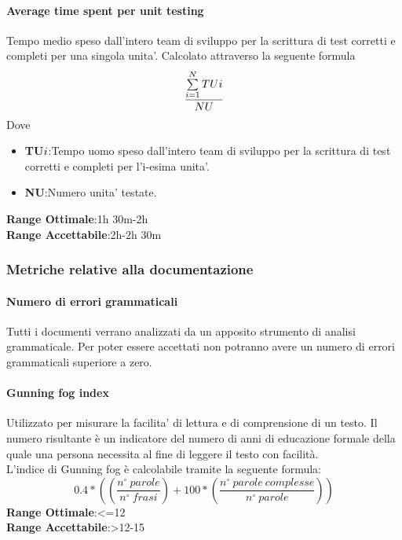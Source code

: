 \paragraph{Average time spent per unit testing}
\begin{flushleft}
Tempo medio speso dall'intero team di sviluppo per la scrittura di test corretti e completi per una singola unita'.
Calcolato attraverso la seguente formula
	$$\frac{\sum\limits_{i=1}^N TU{\small{i}}}{NU}$$
Dove
\begin{itemize}
	\item{\textbf{TU${\small{i}}$}}:Tempo uomo speso dall'intero team di sviluppo per la scrittura di test corretti e completi per l'i-esima unita'.
	\item{\textbf{NU}}:Numero unita' testate.
\end{itemize}
\textbf{Range Ottimale}:1h 30m-2h \\
\textbf{Range Accettabile}:2h-2h 30m
\end{flushleft}
\subsubsection{Metriche relative alla documentazione}
\paragraph{Numero di errori grammaticali}
\begin{flushleft}
Tutti i documenti verrano analizzati da un apposito strumento di analisi grammaticale. Per poter essere accettati non potranno avere un numero di errori grammaticali superiore a zero.
\end{flushleft}

\paragraph{Gunning fog index}
\begin{flushleft}
Utilizzato per misurare la facilita' di lettura e di comprensione di un testo. Il numero risultante è un indicatore del numero di anni di educazione formale della quale una persona necessita al fine di leggere il testo con facilità. \\
L'indice di Gunning fog è calcolabile tramite la seguente formula:
$$
	0.4*((\frac{n^{\circ}\:parole}{n^{\circ}\:frasi})+100*(\frac{n^{\circ}\:parole\:complesse}{n^{\circ}\:parole}))
$$
\textbf{Range Ottimale}:<=12 \\
\textbf{Range Accettabile}:>12-15
\end{flushleft}
